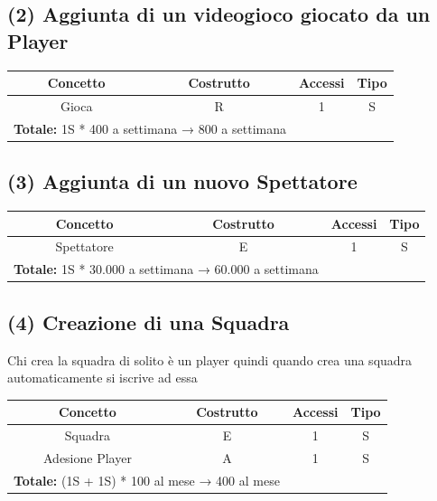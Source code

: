 \documentclass[a4paper,12pt]{report}
\begin{document}
\subsection*{(2) Aggiunta di un videogioco giocato da un Player}
\begin{center}
	\begin{tabular}{|c|c|c|c|}
		\hline\rowcolor{pink}
		Concetto & Costrutto & Accessi & Tipo\\
		\hline\hline
		Gioca & R & 1 & S\\
		\hline\hline
		\multicolumn{2}{l}{%
			\textbf{Totale:} 1S * 400 a settimana → 800 a settimana} \\
		\hline
	\end{tabular}
\end{center}
\subsection*{(3) Aggiunta di un nuovo Spettatore}
\begin{center}
	\begin{tabular}{|c|c|c|c|}
		\hline\rowcolor{pink}
		Concetto & Costrutto & Accessi & Tipo\\
		\hline\hline
		Spettatore & E & 1 & S\\
		\hline\hline
		\multicolumn{2}{l}{%
			\textbf{Totale:}  1S * 30.000 a settimana → 60.000 a settimana } \\
		\hline
	\end{tabular}
\end{center}
\subsection*{(4) Creazione di una Squadra}
Chi crea la squadra di solito è un player quindi quando crea una squadra automaticamente si iscrive ad essa
\begin{center}
	\begin{tabular}{|c|c|c|c|}
		\hline\rowcolor{pink}
		Concetto & Costrutto & Accessi & Tipo\\
		\hline
		Squadra & E & 1 & S\\
		\hline
		Adesione Player & A & 1 & S\\
		\hline\hline
		\multicolumn{2}{l}{%
			\textbf{Totale:} (1S + 1S) * 100 al mese  → 400 al mese} \\
		\hline\hline
	\end{tabular}
\end{center}
\end{document}
